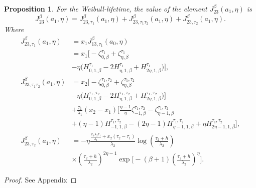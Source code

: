 \documentclass{article}
\newtheorem{proposition}[theorem]{Proposition}
\begin{document}
\begin{proposition}
For the Weibull-lifetime, the value of the element $J_{23}^{\beta}(a_1,\eta)$ is
\begin{equation*}
J_{23}^{\beta}(a_1,\eta)=J_{23,\tau_1}^{\beta}(a_1,\eta)+J_{23,\tau_1\tau_2}^{\beta}(a_1,\eta)+J_{23,\tau_2}^{\beta}(a_1,\eta).
\end{equation*}
Where
\begin{equation}
\begin{aligned}
J_{23,\tau_1}^{\beta}(a_1,\eta)
&=x_1 J_{13,\tau_1}^{\beta}(a_0,\eta)
\\
&=x_1
\Big[
-\zeta_{0,\beta}^{\tau_1}
+\zeta_{\eta,\beta}^{\tau_1}
\\
&-\eta
\big(
H_{0,1,\beta}^{\tau_1}
-2H_{\eta,1,\beta}^{\tau_1}
+H_{2\eta,1,\beta}^{\tau_1}
\big)
\Big],
\\
J_{23,\tau_1\tau_2}^{\beta}(a_1,\eta)
&=
x_2
\Big[
-\zeta_{0,\beta}^{\tau_1,\tau_2}
+\zeta_{\eta,\beta}^{\tau_1,\tau_2}
\\
&-\eta
\big(
H_{0,1,\beta}^{\tau_1,\tau_2}
-2H_{\eta,1,\beta}^{\tau_1,\tau_2}
+H_{2\eta,1,\beta}^{\tau_1,\tau_2}
\big)
\Big]
\\
&
+\frac{\tau_1}{\lambda_1}(x_2-x_1)
\Big[
\frac{\eta-1}{\eta}\zeta_{-1,\beta}^{\tau_1,\tau_2}
-\zeta_{\eta-1,\beta}^{\tau_1,\tau_2}
\\
&
+(\eta-1)H_{-1,1,\beta}^{\tau_1,\tau_2}
-(2\eta-1)H_{\eta-1,1,\beta}^{\tau_1,\tau_2}
+\eta H_{2\eta-1,1,\beta}^{\tau_1,\tau_2}
\Big],
\\
J_{23,\tau_2}^{\beta}(a_1,\eta)
&=
-\eta
\frac{\frac{x_1\lambda_2\tau_1}{\lambda_1}
+x_2(\tau_2-\tau_1)}{\lambda_2}
\log\!\left(
\frac{\tau_2+h}{\lambda_2}
\right)
\\
&\times
\left(
\frac{\tau_2+h}{\lambda_2}
\right)^{2\eta-1}\exp\!\Bigg[
-(\beta+1)
\left(
\frac{\tau_2+h}{\lambda_2}
\right)^{\eta}
\Bigg].
\end{aligned}  \nonumber
\end{equation}

\end{proposition}
\begin{proof}
See Appendix
\end{proof}
\end{document}
